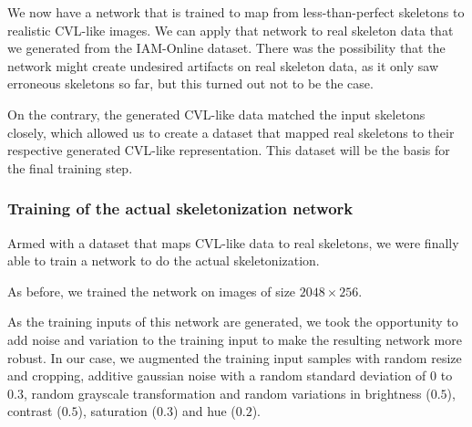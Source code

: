 We now have a network that is trained to map from less-than-perfect skeletons to realistic CVL-like images. We can apply that network to real skeleton data that we generated from the IAM-Online dataset. There was the possibility that the network might create undesired artifacts on real skeleton data, as it only saw erroneous skeletons so far, but this turned out not to be the case.

On the contrary, the generated CVL-like data matched the input skeletons closely, which allowed us to create a dataset that mapped real skeletons to their respective generated CVL-like representation. This dataset will be the basis for the final training step.

\subsubsection{Training of the actual skeletonization network}

Armed with a dataset that maps CVL-like data to real skeletons, we were finally able to train a network to do the actual skeletonization.

As before, we trained the network on images of size $2048 \times 256$.

As the training inputs of this network are generated, we took the opportunity to add noise and variation to the training input to make the resulting network more robust.
In our case, we augmented the training input samples with random resize and cropping, additive gaussian noise with a random standard deviation of $0$ to $0.3$, random grayscale transformation and random variations in brightness ($0.5$), contrast ($0.5$), saturation ($0.3$) and hue ($0.2$).

